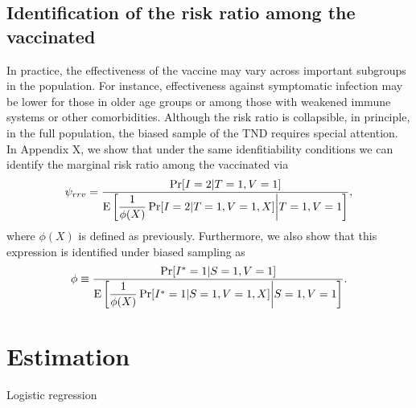 \documentclass[11pt]{article}
\begin{document}
\subsection{Identification of the risk ratio among the vaccinated}
In practice, the effectiveness of the vaccine may vary across important subgroups in the population. For instance, effectiveness against symptomatic infection may be lower for those in older age groups or among those with weakened immune systems or other comorbidities. Although the risk ratio is collapsible, in principle, in the full population, the biased sample of the TND requires special attention. In Appendix X, we show that under the same idenfitiability conditions we can identify the marginal risk ratio among the vaccinated via
\begin{equation*}
    \psi_{rrv} =  \dfrac{\Pr[I = 2 | T = 1, V = 1]}{\operatorname{E}\left[\dfrac{1}{\phi(X)} \Pr[I = 2 | T = 1, V = 1, X] \bigg| T = 1, V = 1\right]},
\end{equation*}
where $\phi(X)$ is defined as previously. Furthermore, we also show that this expression is identified under biased sampling as
\begin{equation}
    \phi \equiv \dfrac{\Pr[I^* = 1 | S = 1, V = 1]}{\operatorname{E}\left[\dfrac{1}{\phi(X)} \Pr[I^* = 1 | S = 1, V = 1, X] \bigg| S = 1, V = 1\right]}.
\end{equation}


\section{Estimation}

Logistic regression 
\end{document}
